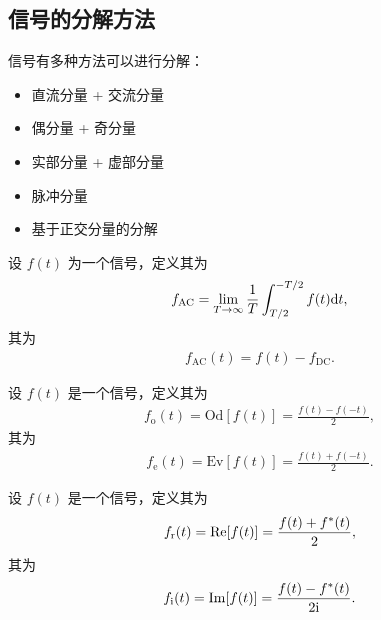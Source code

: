 \subsection{信号的分解方法}

信号有多种方法可以进行分解：
\begin{itemize}
    \item 直流分量 + 交流分量
    \item 偶分量 + 奇分量
    \item 实部分量 + 虚部分量
    \item 脉冲分量
    \item 基于正交分量的分解
\end{itemize}

\begin{definition}
    设 $f(t)$ 为一个信号，定义其为
    \begin{align*}
        f_{\text{AC}} = \lim_{T \to \infty}\frac{1}{T}\int_{T/2}^{-T/2}f(t)\mathrm{d}t,
    \end{align*}
    其为
    \begin{align*}
        f_{\text{AC}}(t) = f(t) - f_{\text{DC}}.
    \end{align*}
\end{definition}

\begin{definition}
    设 $f(t)$ 是一个信号，定义其为
    \begin{align*}
        f_{\text{o}}(t) = \text{Od}[f(t)] = \frac{f(t) - f(-t)}{2},
    \end{align*}
    其为
    \begin{align*}
        f_{\text{e}}(t) = \text{Ev}[f(t)] = \frac{f(t) + f(-t)}{2}.
    \end{align*}
\end{definition}

\begin{definition}
    设 $f(t)$ 是一个信号，定义其为
    \begin{align*}
        f_{\text{r}}(t) = \mathrm{Re}[f(t)] = \frac{f(t) + f^*(t)}{2},
    \end{align*}
    其为
    \begin{align*}
        f_{\text{i}}(t) = \mathrm{Im}[f(t)] = \frac{f(t) - f^*(t)}{2\mathrm{i}}.
    \end{align*}
\end{definition}

